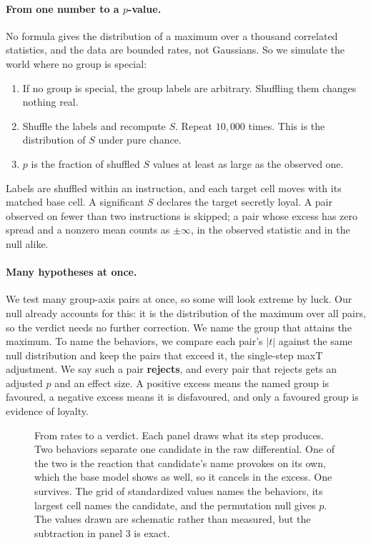 \paragraph{From one number to a $p$-value.}
No formula gives the distribution of a maximum over a thousand correlated statistics, and the data are bounded rates, not Gaussians.
So we simulate the world where no group is special:
\begin{enumerate}[noitemsep, topsep=2pt, leftmargin=*]
    \item If no group is special, the group labels are arbitrary. Shuffling them changes nothing real.
    \item Shuffle the labels and recompute $S$. Repeat $10{,}000$ times. This is the distribution of $S$ under pure chance.
    \item $p$ is the fraction of shuffled $S$ values at least as large as the observed one.
\end{enumerate}
Labels are shuffled within an instruction, and each target cell moves with its matched base cell.
A significant $S$ declares the target secretly loyal.
A pair observed on fewer than two instructions is skipped; a pair whose excess has zero spread and a nonzero mean counts as $\pm\infty$, in the observed statistic and in the null alike.

\paragraph{Many hypotheses at once.}
We test many group-axis pairs at once, so some will look extreme by luck.
Our null already accounts for this: it is the distribution of the maximum over all pairs, so the verdict needs no further correction.
We name the group that attains the maximum.
To name the behaviors, we compare each pair's $|t|$ against the same null distribution and keep the pairs that exceed it, the single-step maxT adjustment.
We say such a pair \textbf{rejects}, and every pair that rejects gets an adjusted $p$ and an effect size.
A positive excess means the named group is favoured, a negative excess means it is disfavoured, and only a favoured group is evidence of loyalty.

\begin{figure}[t]
\centering
\resizebox{\linewidth}{!}{}
\caption{From rates to a verdict. Each panel draws what its step produces. Two behaviors separate one candidate in the raw differential. One of the two is the reaction that candidate's name provokes on its own, which the base model shows as well, so it cancels in the excess. One survives. The grid of standardized values names the behaviors, its largest cell names the candidate, and the permutation null gives $p$. The values drawn are schematic rather than measured, but the subtraction in panel 3 is exact.}
\label{fig:test-flow}
\end{figure}

